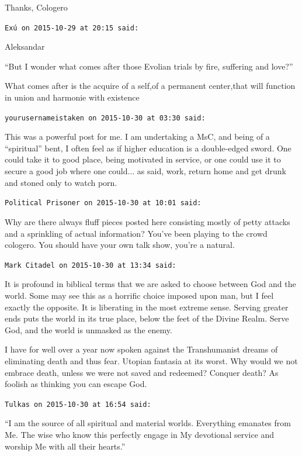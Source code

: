 \begin{footnotesize}
\begin{sffamily}
Thanks, Cologero

\hfill

\texttt{Exú on 2015-10-29 at 20:15 said:}

Aleksandar

``But I wonder what comes after those Evolian trials by fire, suffering and love?''

What comes after is the acquire of a self,of a permanent center,that will function in union and harmonie with existence

\hfill

\texttt{yourusernameistaken on 2015-10-30 at 03:30 said:}

This was a powerful post for me. I am undertaking a MsC, and being of a ``spiritual'' bent, I often feel as if higher education is a double-edged sword. One could take it to good place, being motivated in service, or one could use it to secure a good job where one could... as said, work, return home and get drunk and stoned only to watch porn.

\hfill

\texttt{Political Prisoner on 2015-10-30 at 10:01 said:}

Why are there always fluff pieces posted here consisting mostly of petty attacks and a sprinkling of actual information? You've been playing to the crowd cologero. You should have your own talk show, you're a natural.

\hfill

\texttt{Mark Citadel on 2015-10-30 at 13:34 said:}

It is profound in biblical terms that we are asked to choose between God and the world. Some may see this as a horrific choice imposed upon man, but I feel exactly the opposite. It is liberating in the most extreme sense. Serving greater ends puts the world in its true place, below the feet of the Divine Realm. Serve God, and the world is unmasked as the enemy.

I have for well over a year now spoken against the Transhumanist dreams of eliminating death and thus fear. Utopian fantasia at its worst. Why would we not embrace death, unless we were not saved and redeemed? Conquer death? As foolish as thinking you can escape God.

\hfill

\texttt{Tulkas on 2015-10-30 at 16:54 said:}

``I am the source of all spiritual and material worlds. Everything emanates from Me. The wise who know this perfectly engage in My devotional service and worship Me with all their hearts.''


\end{sffamily}
\end{footnotesize}
